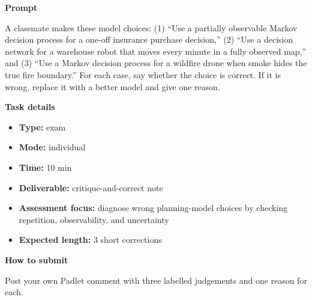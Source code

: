 \documentclass[11pt]{article}
\begin{document}
\begin{tcolorbox}[colback=white,colframe=MidnightBlue,title={Q6 Planning Model Choice},fonttitle=\bfseries,breakable]
\begin{center}
\end{center}

{\large\bfseries\color{MidnightBlue} Prompt}\par\medskip
A classmate makes these model choices: (1) ``Use a partially observable Markov decision process for a one-off insurance purchase decision,'' (2) ``Use a decision network for a warehouse robot that moves every minute in a fully observed map,'' and (3) ``Use a Markov decision process for a wildfire drone when smoke hides the true fire boundary.'' For each case, say whether the choice is correct. If it is wrong, replace it with a better model and give one reason.

{\large\bfseries\color{MidnightBlue} Task details}\par\medskip
\begin{itemize}\item \textbf{Type:} exam
\item \textbf{Mode:} individual
\item \textbf{Time:} 10 min
\item \textbf{Deliverable:} critique-and-correct note
\item \textbf{Assessment focus:} diagnose wrong planning-model choices by checking repetition, observability, and uncertainty
\item \textbf{Expected length:} 3 short corrections\end{itemize}

{\large\bfseries\color{MidnightBlue} How to submit}\par\medskip
Post your own Padlet comment with three labelled judgements and one reason for each.


\end{tcolorbox}
\end{document}
